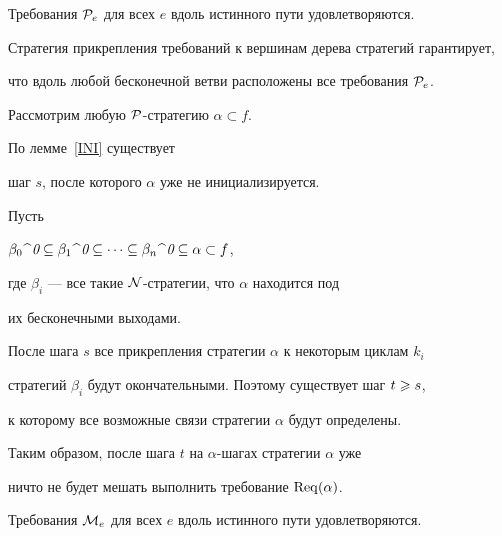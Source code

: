 \begin{lems}


Требования ${\cal P}_e$ для всех $e$ вдоль истинного пути удовлетворяются.


\end{lems}





\begin{pf}


Стратегия прикрепления требований к вершинам дерева стратегий гарантирует,


что вдоль любой бесконечной ветви расположены все требования ${\cal P}_e$.





Рассмотрим любую $\cal P$-стратегию $\alpha\subset f$.


По лемме~\ref{INI} существует


шаг $s$, после которого $\alpha$ уже не инициализируется.


Пусть


$\con{\beta_0}{\text{\it 0}}\subseteq\con{\beta_1}{\text{\it 0}}


\subseteq\dotsb\subseteq\con{\beta_n}{\text{\it 0}}\subseteq\alpha\subset f$,


где $\beta_i$ --- все такие $\cal N$-стратегии, что $\alpha$ находится под


их бесконечными выходами.


После шага $s$ все прикрепления стратегии $\alpha$ к некоторым циклам $k_i$


стратегий $\beta_i$ будут окончательными. Поэтому существует шаг $t\geqslant s$,


к которому все возможные связи стратегии $\alpha$ будут определены.


Таким образом, после шага $t$ на $\alpha$-шагах стратегии $\alpha$ уже


ничто не будет мешать выполнить требование $\operatorname{Req}(\alpha)$.


\end{pf}





\begin{lems}


Требования ${\cal M}_e$ для всех $e$ вдоль истинного пути удовлетворяются.


\end{lems}






